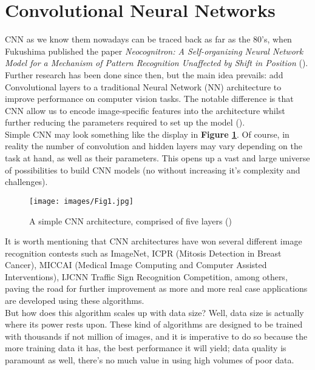 \documentclass[11pt]{article}
\begin{document}
\clearpage

\section{Convolutional Neural Networks} \label{Section3}

CNN as we know them nowadays can be traced back as far as the 80's, when Fukushima published the paper \emph{Neocognitron: A Self-organizing Neural Network Model for a Mechanism of Pattern Recognition Unaffected by Shift in Position} (\cite{fukushima1982neocognitron}). Further research has been done since then, but the main idea prevails: add Convolutional layers to a traditional Neural Network (NN) architecture to improve performance on computer vision tasks. The notable difference is that CNN allow us to encode image-specific features into the architecture whilst further reducing the parameters required to set up the model (\cite{o2015introduction}).\\

Simple CNN may look something like the display in \textbf{Figure \ref{fig:Fig1}}. Of course, in reality the number of convolution and hidden layers may vary depending on the task at hand, as well as their parameters. This opens up a vast and large universe of possibilities to build CNN models (no without increasing it's complexity and challenges).\\

\begin{figure}[H]
    \centering
    \texttt{[image: images/Fig1.jpg]}
    \caption{A simple CNN architecture, comprised of five layers (\cite{o2015introduction})}
    \label{fig:Fig1}
\end{figure}

It is worth mentioning that CNN architectures have won several different image recognition contests such as ImageNet, ICPR (Mitosis Detection in Breast Cancer), MICCAI (Medical Image Computing and Computer Assisted Interventions), IJCNN Traffic Sign Recognition Competition, among others, paving the road for further improvement as more and more real case applications are developed using these algorithms.\\

But how does this algorithm scales up with data size? Well, data size is actually where its power rests upon. These kind of algorithms are designed to be trained with thousands if not million of images, and it is imperative to do so because the more training data it has, the best performance it will yield; data quality is paramount as well, there's no much value in using high volumes of poor data. \\
\end{document}
